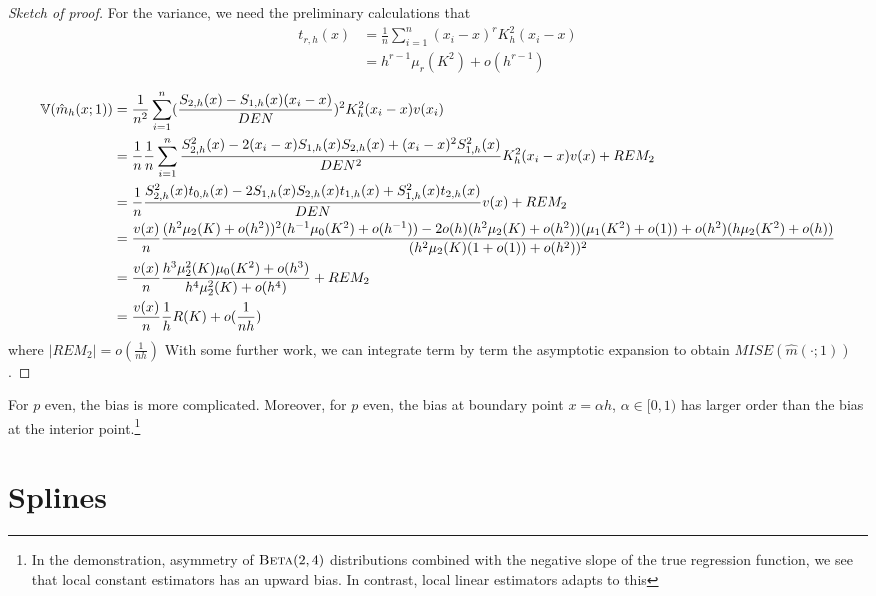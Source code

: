 \begin{proof}[Sketch of proof]
  For the variance, we need the preliminary calculations that
  \begin{align}
    \label{eq:62}
    t_{r, h}(x) &= \frac{1}{n} \sum_{i=1}^{n} (x_{i} - x)^{r}
    K_{h}^{2}(x_{i} - x) \\
    &= h^{r-1} \mu_{r}(K^{2}) + o(h^{r-1})
  \end{align}

  \begin{align}
    \label{eq:63}
    \Var{\hat m_{h}(x; 1)} &= \frac{1}{n^{2}} \sum_{i=1}^{n}
    (\frac{S_{2, h}(x) - S_{1, h}(x)(x_{i} - x)}{DEN})^{2}
    K_{h}^{2}(x_{i} - x) v(x_{i}) \\
    &= \frac{1}{n} \frac{1}{n} \sum_{i=1}^{n} \frac{S_{2, h}^{2}(x) -
      2(x_{i} - x) S_{1, h}(x) S_{2, h}(x) + (x_{i} - x)^{2} S_{1,
        h}^{2}(x)}{DEN^{2}}  K^{2}_{h}(x_{i} - x) v(x) + REM_{2} \\
    &= \frac{1}{n} \frac{S_{2, h}^{2}(x) t_{0, h}(x) - 2 S_{1, h}(x)
      S_{2, h}(x) t_{1, h}(x) + S_{1, h}^{2}(x) t_{2, h}(x)}{DEN} v(x)
    + REM_{2} \\
    &= \frac{v(x)}{n} \frac{(h^{2} \mu_{2} (K) + o(h^{2}))^{2} (h^{-1}
      \mu_{0}(K^{2}) +o(h^{-1})) - 2 o(h) (h^{2} \mu_{2}(K) +
      o(h^{2}))(\mu_{1}(K^{2}) + o(1)) + o(h^{2}) (h \mu_{2} (K^{2}) +
      o(h))}{(h^{2} \mu_{2}(K)(1 + o(1)) + o(h^{2}))^{2}} \\
    &= \frac{v(x)}{n} \frac{h^{3} \mu_{2}^{2}(K) \mu_{0}(K^{2}) +
      o(h^{3})}{h^{4} \mu_{2}^{2}(K) + o(h^{4})} + REM_{2} \\
      &= \frac{v(x)}{n}  \frac{1}{h}  R(K) + o(\frac{1}{nh})
    \end{align} where $|REM_{2}| = o(\frac{1}{nh})$
    With some further work, we can integrate term by term the
    asymptotic expansion to obtain $MISE(\hat m(\cdot; 1))$.
\end{proof}

For $p$ even, the bias is more complicated. Moreover, for $p$ even,
the bias at boundary point $x = \alpha h$, $\alpha \in [0, 1)$ has
larger order than the bias at the interior point.\footnote{In the
  demonstration, asymmetry of $\textsc{Beta}(2, 4)$ distributions
  combined with the negative slope of the true regression function, we
  see that local constant estimators has an upward bias. In contrast,
  local linear estimators adapts to this}

\section{Splines}
\label{sec:splines}


